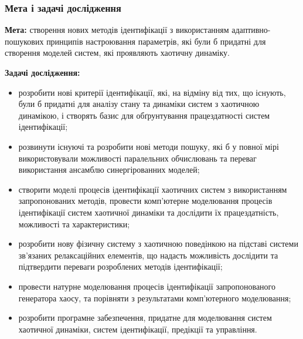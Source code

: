 \documentclass[14pt,handout,utf8]{beamer}
\begin{document}
\begin{frame}
  \frametitle{Мета і задачі дослідження}

\textbf{Мета:} створення нових методів ідентифікації з
використанням адаптивно-пошукових принципів настроювання параметрів, які
були б придатні для створення моделей систем, які проявляють хаотичну динаміку.

\textbf{Задачі дослідження:}
  \begin{itemize}

    \item
      розробити нові критерії ідентифікації, які, на відміну від тих, що
      існують, були б придатні для аналізу стану та динаміки
      систем з хаотичною динамікою, і створять базис для обґрунтування працездатності систем
      ідентифікації;

    \item
      розвинути існуючі та розробити нові методи пошуку, які б
      у повної мірі використовували можливості
      паралельних обчислювань та переваг використання ансамблю
      синергірованних моделей;

    \item
      створити моделі процесів
      ідентифікації хаотичних систем з використанням запропонованих методів,
      провести комп'ютерне моделювання процесів ідентифікації систем
      хаотичної динаміки та дослідити їх працездатність, можливості та
      характеристики;

    \item
      розробити нову фізичну систему з хаотичною поведінкою
      на підставі системи зв'язаних релаксаційних елементів,
      що надасть можливість дослідити та підтвердити переваги
      розроблених методів ідентифікації;

    \item
      провести натурне моделювання процесів ідентифікації запропонованого
      генератора хаосу, та порівняти з результатами комп'ютерного моделювання;

    \item
      розробити програмне забезпечення, придатне для моделювання систем
      хаотичної динаміки, систем ідентифікації, предікції та управління.

\end{itemize}


\end{frame}

\end{document}
